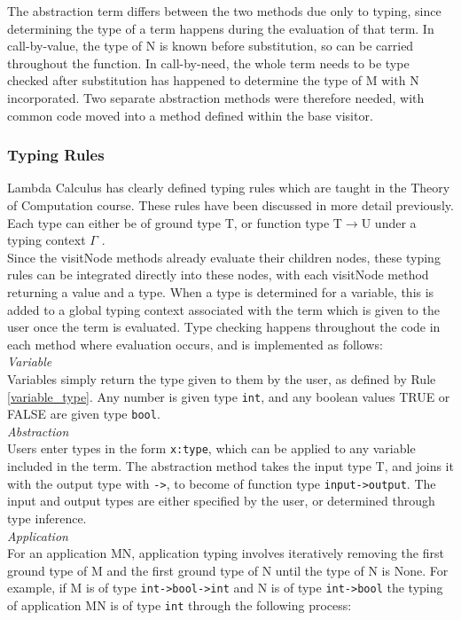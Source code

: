 \documentclass[a4paper,11pt]{report}
\begin{document}
The abstraction term differs between the two methods due only to typing, since determining the type of a term happens during the evaluation of that term. In call-by-value, the type of N is known before substitution, so can be carried throughout the function. In call-by-need, the whole term needs to be type checked after substitution has happened to determine the type of M with N incorporated. Two separate abstraction methods were therefore needed, with common code moved into a method defined within the base visitor.

\subsubsection{Typing Rules}

Lambda Calculus has clearly defined typing rules which are taught in the Theory of Computation course. These rules have been discussed in more detail previously. Each type can either be of ground type T, or function type T$\rightarrow$U under a typing context $\Gamma$ \cite{Hankin2004}.\\

Since the visitNode methods already evaluate their children nodes, these typing rules can be integrated directly into these nodes, with each visitNode method returning a value and a type. When a type is determined for a variable, this is added to a global typing context associated with the term which is given to the user once the term is evaluated. Type checking happens throughout the code in each method where evaluation occurs, and is implemented as follows:\\

\textit{Variable}\\
Variables simply return the type given to them by the user, as defined by Rule \ref{variable_type}. Any number is given type \texttt{int}, and any boolean values TRUE or FALSE are given type \texttt{bool}.\\

\textit{Abstraction}\\
Users enter types in the form \texttt{x:type}, which can be applied to any variable included in the term. The abstraction method takes the input type T, and joins it with the output type with \texttt{->}, to become of function type \texttt{input->output}. The input and output types are either specified by the user, or determined through type inference.\\

\textit{Application}\\
For an application MN, application typing involves iteratively removing the first ground type of M and the first ground type of N until the type of N is None. For example, if M is of type \texttt{int->bool->int} and N is of type \texttt{int->bool} the typing of application MN is of type \texttt{int} through the following process:
\end{document}
